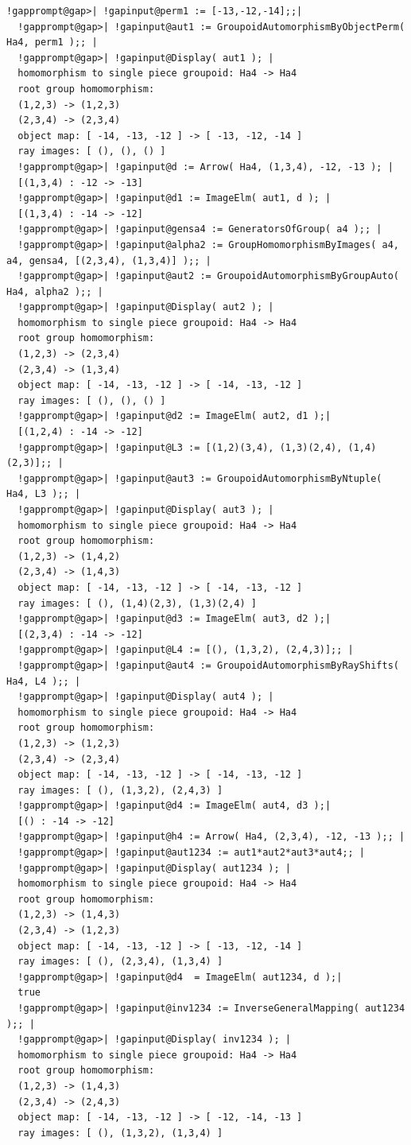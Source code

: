 \documentclass[a4paper,11pt]{report}
\begin{document}
{{\begin{Verbatim}[commandchars=!@|,fontsize=\small,frame=single,label=Example]
  !gapprompt@gap>| !gapinput@perm1 := [-13,-12,-14];;|
  !gapprompt@gap>| !gapinput@aut1 := GroupoidAutomorphismByObjectPerm( Ha4, perm1 );; |
  !gapprompt@gap>| !gapinput@Display( aut1 ); |
  homomorphism to single piece groupoid: Ha4 -> Ha4
  root group homomorphism:
  (1,2,3) -> (1,2,3)
  (2,3,4) -> (2,3,4)
  object map: [ -14, -13, -12 ] -> [ -13, -12, -14 ]
  ray images: [ (), (), () ]
  !gapprompt@gap>| !gapinput@d := Arrow( Ha4, (1,3,4), -12, -13 ); |
  [(1,3,4) : -12 -> -13]
  !gapprompt@gap>| !gapinput@d1 := ImageElm( aut1, d ); |
  [(1,3,4) : -14 -> -12]
  !gapprompt@gap>| !gapinput@gensa4 := GeneratorsOfGroup( a4 );; |
  !gapprompt@gap>| !gapinput@alpha2 := GroupHomomorphismByImages( a4, a4, gensa4, [(2,3,4), (1,3,4)] );; |
  !gapprompt@gap>| !gapinput@aut2 := GroupoidAutomorphismByGroupAuto( Ha4, alpha2 );; |
  !gapprompt@gap>| !gapinput@Display( aut2 ); |
  homomorphism to single piece groupoid: Ha4 -> Ha4
  root group homomorphism:
  (1,2,3) -> (2,3,4)
  (2,3,4) -> (1,3,4)
  object map: [ -14, -13, -12 ] -> [ -14, -13, -12 ]
  ray images: [ (), (), () ]
  !gapprompt@gap>| !gapinput@d2 := ImageElm( aut2, d1 );|
  [(1,2,4) : -14 -> -12]
  !gapprompt@gap>| !gapinput@L3 := [(1,2)(3,4), (1,3)(2,4), (1,4)(2,3)];; |
  !gapprompt@gap>| !gapinput@aut3 := GroupoidAutomorphismByNtuple( Ha4, L3 );; |
  !gapprompt@gap>| !gapinput@Display( aut3 ); |
  homomorphism to single piece groupoid: Ha4 -> Ha4
  root group homomorphism:
  (1,2,3) -> (1,4,2)
  (2,3,4) -> (1,4,3)
  object map: [ -14, -13, -12 ] -> [ -14, -13, -12 ]
  ray images: [ (), (1,4)(2,3), (1,3)(2,4) ]
  !gapprompt@gap>| !gapinput@d3 := ImageElm( aut3, d2 );|
  [(2,3,4) : -14 -> -12]
  !gapprompt@gap>| !gapinput@L4 := [(), (1,3,2), (2,4,3)];; |
  !gapprompt@gap>| !gapinput@aut4 := GroupoidAutomorphismByRayShifts( Ha4, L4 );; |
  !gapprompt@gap>| !gapinput@Display( aut4 ); |
  homomorphism to single piece groupoid: Ha4 -> Ha4
  root group homomorphism:
  (1,2,3) -> (1,2,3)
  (2,3,4) -> (2,3,4)
  object map: [ -14, -13, -12 ] -> [ -14, -13, -12 ]
  ray images: [ (), (1,3,2), (2,4,3) ]
  !gapprompt@gap>| !gapinput@d4 := ImageElm( aut4, d3 );|
  [() : -14 -> -12]
  !gapprompt@gap>| !gapinput@h4 := Arrow( Ha4, (2,3,4), -12, -13 );; |
  !gapprompt@gap>| !gapinput@aut1234 := aut1*aut2*aut3*aut4;; |
  !gapprompt@gap>| !gapinput@Display( aut1234 ); |
  homomorphism to single piece groupoid: Ha4 -> Ha4
  root group homomorphism:
  (1,2,3) -> (1,4,3)
  (2,3,4) -> (1,2,3)
  object map: [ -14, -13, -12 ] -> [ -13, -12, -14 ]
  ray images: [ (), (2,3,4), (1,3,4) ]
  !gapprompt@gap>| !gapinput@d4  = ImageElm( aut1234, d );|
  true
  !gapprompt@gap>| !gapinput@inv1234 := InverseGeneralMapping( aut1234 );; |
  !gapprompt@gap>| !gapinput@Display( inv1234 ); |
  homomorphism to single piece groupoid: Ha4 -> Ha4
  root group homomorphism:
  (1,2,3) -> (1,4,3)
  (2,3,4) -> (2,4,3)
  object map: [ -14, -13, -12 ] -> [ -12, -14, -13 ]
  ray images: [ (), (1,3,2), (1,3,4) ]
  

\end{Verbatim}}}
\end{document}
